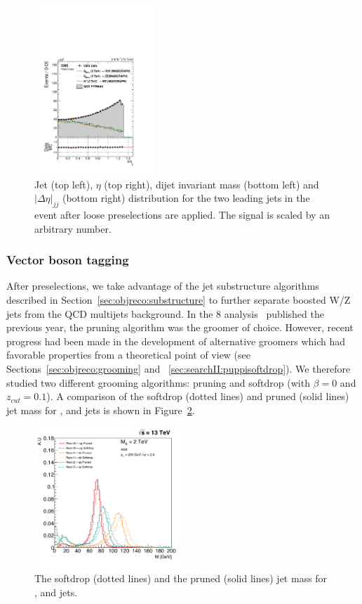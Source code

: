 \begin{figure}[h!]
\includegraphics[width=0.4\textwidth]{figures/analysis/search1/AN-15-211/controlplots/silverjson/DeltaEta_WSignal.pdf}
\caption{Jet \PT (top left), $\eta$ (top right), dijet invariant mass (bottom left) and $|\Delta \eta|_{jj}$ (bottom right) distribution for the two leading jets in the event after loose preselections are applied. The signal is scaled by an arbitrary number.}
\label{fig:kinematics-all}
\end{figure}

\subsubsection{Vector boson tagging}

After preselections, we take advantage of the jet substructure algorithms described in Section~\ref{sec:objreco:substructure} to further separate boosted W/Z jets from the QCD multijets background. In the 8 \TeV analysis~\cite{Khachatryan:1700394} published the previous year, the pruning algorithm was the groomer of choice. However, recent progress had been made in the development of alternative groomers which had favorable properties from a theoretical point of view (see Sections~\ref{sec:objreco:grooming} and ~\ref{sec:searchII:puppisoftdrop}). We therefore studied two different grooming algorithms: pruning and softdrop (with $\beta=0$ and $z_{cut} = 0.1$). A comparison of the softdrop (dotted lines) and pruned (solid lines) jet mass for \PW, \PZ and \PH jets is shown in Figure~\ref{fig:searchI:sdvspruning}.

 \begin{figure}[h!]
 \centering
 \includegraphics[width=0.49\textwidth]{figures/analysis/search1/misc/SDvsPruned.pdf}
 \caption{The softdrop (dotted lines) and the pruned (solid lines) jet mass for \PW, \PZ and \PH jets.}
 \label{fig:searchI:sdvspruning}
 \end{figure}
 
